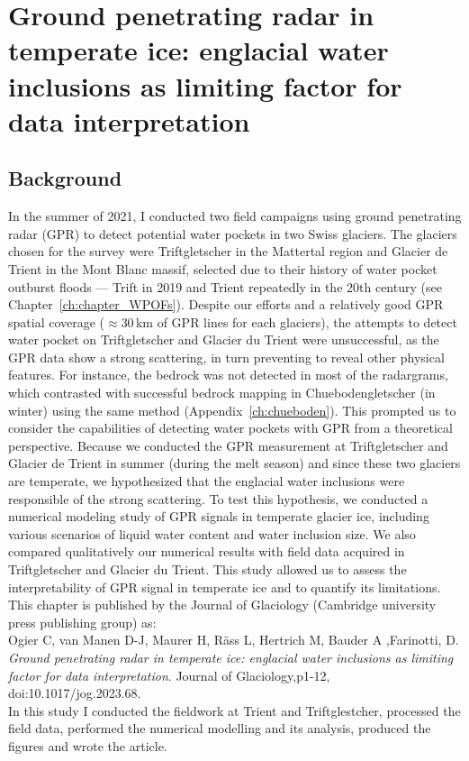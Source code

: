 \chapter[GPR in temperate ice: englacial water inclusions as limiting factor for data interpretation]{Ground penetrating radar in temperate ice: englacial water inclusions as limiting factor for data interpretation}
\label{ch:chapter_gprmax}


\section{Background}

In the summer of 2021, I conducted two field campaigns using ground penetrating radar (GPR) to detect potential water pockets in two Swiss glaciers. The glaciers chosen for the survey were Triftgletscher in the Mattertal region and Glacier de Trient in the Mont Blanc massif, selected due to their history of water pocket outburst floods — Trift in 2019 and Trient repeatedly in the 20th century (see Chapter~\ref{ch:chapter_WPOFs}). Despite our efforts and a relatively good GPR spatial coverage ($\approx$30\,km of GPR lines for each glaciers), the attempts to detect water pocket on Triftgletscher and Glacier du Trient were unsuccessful, as the GPR data show a strong scattering, in turn preventing to reveal other physical features. For instance, the bedrock was not detected in most of the radargrams, which contrasted with successful bedrock mapping in Chuebodengletscher (in winter) using the same method (Appendix~\ref{ch:chueboden}). This prompted us to consider the capabilities of detecting water pockets with GPR from a theoretical perspective. Because we conducted the GPR measurement at Triftgletscher and Glacier de Trient in summer (during the melt season) and since these two glaciers are temperate, we hypothesized that the englacial water inclusions were responsible of the strong scattering. To test this hypothesis, we conducted a numerical modeling study of GPR signals in temperate glacier ice, including various scenarios of liquid water content and water inclusion size. We also compared qualitatively our numerical results with field data acquired in Triftgletscher and Glacier du Trient. This study allowed us to assess the interpretability of GPR signal in temperate ice and to quantify its limitations.\\
This chapter is published by the Journal of Glaciology (Cambridge university press publishing
group) as:\\
Ogier C, van Manen D-J, Maurer H, Räss L, Hertrich M, Bauder A ,Farinotti, D. \textit{Ground penetrating radar in temperate ice: englacial water inclusions as limiting factor for data interpretation}. Journal of Glaciology,p1-12, doi:10.1017/jog.2023.68.\\
In this study I conducted the fieldwork at Trient and Triftglestcher, processed the field data, performed the numerical modelling and its analysis, produced the figures and wrote the article. 

